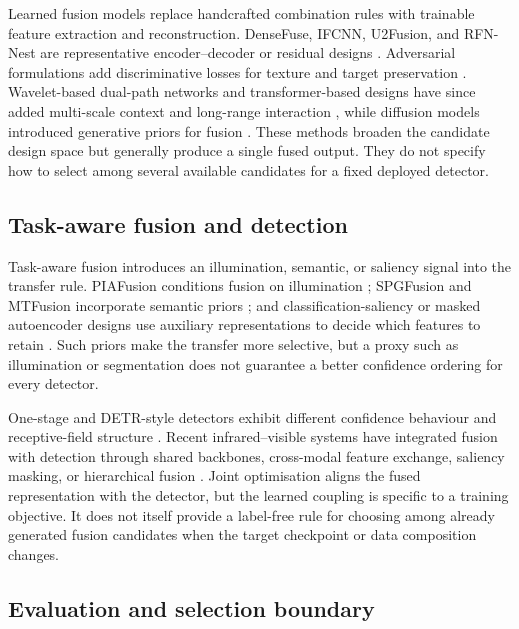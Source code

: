 \documentclass[preprint,11pt]{elsarticle}
\begin{document}
Learned fusion models replace handcrafted combination rules with trainable
feature extraction and reconstruction. DenseFuse, IFCNN, U2Fusion, and RFN-Nest
are representative encoder--decoder or residual designs
\cite{li2019densefuse,zhang2020,xu2022u2fusion,li2021rfn}. Adversarial
formulations add discriminative losses for texture and target preservation
\cite{ma2019fusiongan,hou2021ssgan,yi2021dfpgan,song2022tdgan}.
Wavelet-based dual-path networks and transformer-based designs have since added
multi-scale context and long-range interaction
\cite{liu2023dualpath,hao2022vdfefuse,yang2023dglt,an2024mras}, while diffusion
models introduced generative priors for fusion \cite{yi2024diffif,yang2025lfdt}.
These methods broaden the candidate design space but generally produce a single
fused output. They do not specify how to select among several available
candidates for a fixed deployed detector.

\subsection{Task-aware fusion and detection}

Task-aware fusion introduces an illumination, semantic, or saliency signal into
the transfer rule. PIAFusion conditions fusion on illumination
\cite{tang2022}; SPGFusion and MTFusion incorporate semantic priors
\cite{zhang2026,zhou2026mtfusion}; and classification-saliency or masked
autoencoder designs use auxiliary representations to decide which features to
retain \cite{xu2021classsaliency,wang2025smae}. Such priors make the transfer
more selective, but a proxy such as illumination or segmentation does not
guarantee a better confidence ordering for every detector.

One-stage and DETR-style detectors exhibit different confidence behaviour and
receptive-field structure \cite{redmon2016yolo,wang2024yolov9,wang2024yolov10,zhao2024rtdetr}.
Recent infrared--visible systems have integrated fusion with detection through shared
backbones, cross-modal feature exchange, saliency masking, or hierarchical
fusion \cite{zhao2025cmifdf,gao2026coifsd,an2026mrtdetr,zhang2026hffn,xiang2025unifusod,yue2022lowlight}.
Joint optimisation aligns the fused representation with the detector, but the
learned coupling is specific to a training objective. It does not itself
provide a label-free rule for choosing among already generated fusion
candidates when the target checkpoint or data composition changes.

\subsection{Evaluation and selection boundary}
\end{document}
